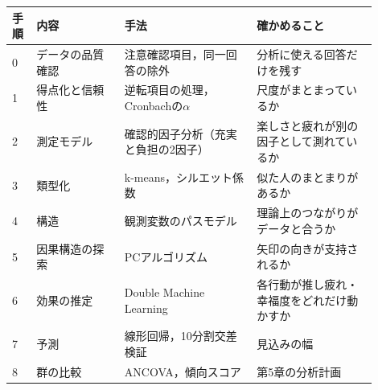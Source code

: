 \begin{table}[h]
\centering
{}
\label{tab:analysis}
\small
\begin{tabular}{@{}p{0.05\linewidth}p{0.22\linewidth}p{0.33\linewidth}p{0.3\linewidth}@{}}
\toprule
手順 & 内容 & 手法 & 確かめること \\
\midrule
0 & データの品質確認 & 注意確認項目，同一回答の除外 & 分析に使える回答だけを残す \\
1 & 得点化と信頼性 & 逆転項目の処理，Cronbachの$\alpha$ & 尺度がまとまっているか \\
2 & 測定モデル & 確認的因子分析（充実と負担の2因子） & 楽しさと疲れが別の因子として測れているか \\
3 & 類型化 & k-means，シルエット係数\cite{rousseeuw1987} & 似た人のまとまりがあるか \\
4 & 構造 & 観測変数のパスモデル\cite{igolkina2020} & 理論上のつながりがデータと合うか \\
5 & 因果構造の探索 & PCアルゴリズム\cite{spirtes2000} & 矢印の向きが支持されるか \\
6 & 効果の推定 & Double Machine Learning\cite{chernozhukov2018} & 各行動が推し疲れ・幸福度をどれだけ動かすか \\
7 & 予測 & 線形回帰，10分割交差検証 & 見込みの幅 \\
8 & 群の比較 & ANCOVA，傾向スコア\cite{rosenbaum1983,hoshino2009} & 第5章の分析計画 \\
\bottomrule
\end{tabular}
\end{table}

